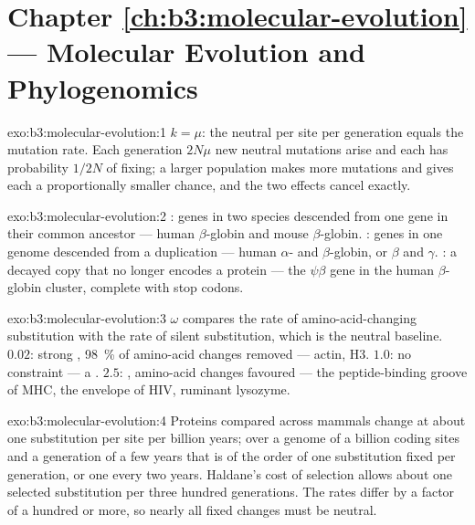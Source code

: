 \section*{Chapter \ref{ch:b3:molecular-evolution} --- Molecular Evolution and Phylogenomics}

\begin{solution}{exo:b3:molecular-evolution:1}
$k = \mu$: the neutral  per site per generation equals
the mutation rate. Each generation $2N\mu$ new neutral mutations arise
and each has probability $1/2N$ of fixing; a larger population makes
more mutations and gives each a proportionally smaller chance, and the
two effects cancel exactly.
\end{solution}

\begin{solution}{exo:b3:molecular-evolution:2}
: genes in two species descended from one gene in their
common ancestor --- human $\beta$-globin and mouse $\beta$-globin.
: genes in one genome descended from a duplication ---
human $\alpha$- and $\beta$-globin, or $\beta$ and $\gamma$. : a
decayed copy that no longer encodes a protein --- the $\psi\beta$ gene
in the human $\beta$-globin cluster, complete with stop codons.
\end{solution}

\begin{solution}{exo:b3:molecular-evolution:3}
$\omega$ compares the rate of amino-acid-changing substitution with the
rate of silent substitution, which is the neutral baseline. $0.02$:
strong , \qty{98}{\%} of amino-acid changes removed
--- actin,  H3. $1.0$: no constraint --- a . $2.5$:
, amino-acid changes favoured --- the peptide-binding
groove of MHC, the envelope of HIV, ruminant lysozyme.
\end{solution}

\begin{solution}{exo:b3:molecular-evolution:4}
Proteins compared across mammals change at about one substitution per
site per billion years; over a genome of a billion coding sites and a
generation of a few years that is of the order of one substitution
fixed per generation, or one every two years. Haldane's cost of
selection allows about one selected substitution per three hundred
generations. The rates differ by a factor of a hundred or more, so
nearly all fixed changes must be neutral.
\end{solution}

